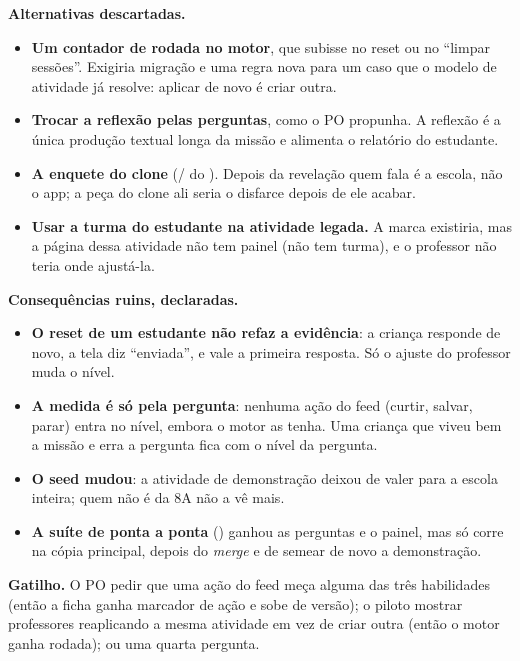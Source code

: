 \textbf{Alternativas descartadas.}

\begin{itemize}
  \item \textbf{Um contador de rodada no motor}, que subisse no reset ou no
    \enquote{limpar sessões}. Exigiria migração e uma regra nova para um caso
    que o modelo de atividade já resolve: aplicar de novo é criar outra.
  \item \textbf{Trocar a reflexão pelas perguntas}, como o PO propunha. A
    reflexão é a única produção textual longa da missão e alimenta o
    relatório do estudante.
  \item \textbf{A enquete do clone} (/ do
    ). Depois da revelação quem fala é a escola, não o app; a
    peça do clone ali seria o disfarce depois de ele acabar.
  \item \textbf{Usar a turma do estudante na atividade legada.} A marca
    existiria, mas a página dessa atividade não tem painel (não tem turma), e
    o professor não teria onde ajustá-la.
\end{itemize}

\textbf{Consequências ruins, declaradas.}

\begin{itemize}
  \item \textbf{O reset de um estudante não refaz a evidência}: a criança
    responde de novo, a tela diz \enquote{enviada}, e vale a primeira resposta.
    Só o ajuste do professor muda o nível.
  \item \textbf{A medida é só pela pergunta}: nenhuma ação do feed (curtir,
    salvar, parar) entra no nível, embora o motor as tenha. Uma criança que
    viveu bem a missão e erra a pergunta fica com o nível da pergunta.
  \item \textbf{O seed mudou}: a atividade de demonstração deixou de valer para
    a escola inteira; quem não é da 8A não a vê mais.
  \item \textbf{A suíte de ponta a ponta} () ganhou as
    perguntas e o painel, mas só corre na cópia principal, depois do
    \emph{merge} e de semear de novo a demonstração.
\end{itemize}

\textbf{Gatilho.} O PO pedir que uma ação do feed meça alguma das três
habilidades (então a ficha ganha marcador de ação e sobe de versão); o piloto
mostrar professores reaplicando a mesma atividade em vez de criar outra (então
o motor ganha rodada); ou uma quarta pergunta.

